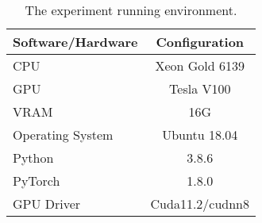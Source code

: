 

\begin{table}[htb]
    \caption{The experiment running environment.}\label{tbl:ch2-exp-env}
    \centering
    \begin{tabular}{l c}
        \toprule
        Software/Hardware & Configuration   \\
        \midrule
        CPU               & Xeon Gold 6139  \\
        GPU               & Tesla V100      \\
        VRAM              & 16G             \\
        Operating System  & Ubuntu 18.04    \\
        Python            & 3.8.6           \\
        PyTorch           & 1.8.0           \\
        GPU Driver        & Cuda11.2/cudnn8 \\
        \bottomrule
    \end{tabular}
\end{table}



